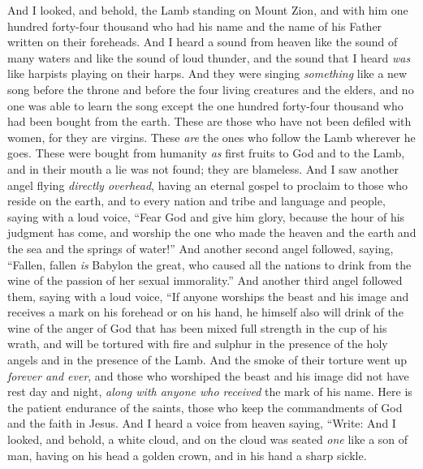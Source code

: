 \begin{biblechapter} %
 And I looked, and behold, the Lamb standing on Mount Zion, and with him one hundred forty-four thousand who had his name and the name of his Father written on their foreheads.
\verse And I heard a sound from heaven like the sound of many waters and like the sound of loud thunder, and the sound that I heard \textit{was} like harpists playing on their harps.
\verse And they were singing \textit{something} like a new song before the throne and before the four living creatures and the elders, and no one was able to learn the song except the one hundred forty-four thousand who had been bought from the earth.
\verse These are those who have not been defiled with women, for they are virgins. These \textit{are} the ones who follow the Lamb wherever he goes. These were bought from humanity \textit{as} first fruits to God and to the Lamb,
\verse and in their mouth a lie was not found; they are blameless.
 And I saw another angel flying \textit{directly overhead}, having an eternal gospel to proclaim to those who reside on the earth, and to every nation and tribe and language and people,
\verse saying with a loud voice, “Fear God and give him glory, because the hour of his judgment has come, and worship the one who made the heaven and the earth and the sea and the springs of water!”
\verse And another second angel followed, saying, “Fallen, fallen \textit{is} Babylon the great, who caused all the nations to drink from the wine of the passion of her sexual immorality.”
\verse And another third angel followed them, saying with a loud voice, “If anyone worships the beast and his image and receives a mark on his forehead or on his hand,
\verse he himself also will drink of the wine of the anger of God that has been mixed full strength in the cup of his wrath, and will be tortured with fire and sulphur in the presence of the holy angels and in the presence of the Lamb.
\verse And the smoke of their torture went up \textit{forever and ever}, and those who worshiped the beast and his image did not have rest day and night, \textit{along with anyone who received} the mark of his name.
\verse Here is the patient endurance of the saints, those who keep the commandments of God and the faith in Jesus.
\verse And I heard a voice from heaven saying, “Write:
 And I looked, and behold, a white cloud, and on the cloud was seated \textit{one} like a son of man, having on his head a golden crown, and in his hand a sharp sickle.

\end{biblechapter}
